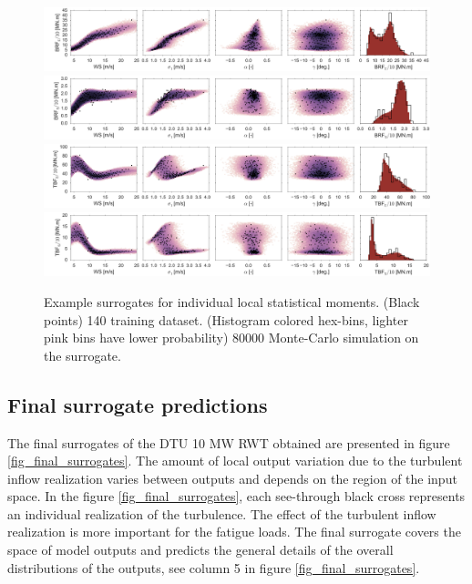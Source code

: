\documentclass[preprint,12pt]{elsarticle}
\begin{document}
\begin{figure}[h!]
\begin{centering}
\includegraphics[width=0.94\columnwidth]{Figures/Surrgotes_20-fold/BRFBM_EFL_M12_E_MC_PCE_last_row.jpg} \\
\includegraphics[width=0.94\columnwidth]{Figures/Surrgotes_20-fold/BRFBM_EFL_M12_S_MC_PCE_last_row.jpg} \\
\includegraphics[width=0.94\columnwidth]{Figures/Surrgotes_20-fold/TBFBM_EFL_M4_E_MC_PCE_last_row.jpg} \\
\includegraphics[width=0.94\columnwidth]{Figures/Surrgotes_20-fold/TBFBM_EFL_M4_S_MC_PCE_last_row.jpg}
\caption{Example surrogates for individual local statistical moments. (Black points) 140 training dataset. (Histogram colored hex-bins, lighter pink bins have lower probability) 80000 Monte-Carlo simulation on the surrogate.}
\label{fig_y_hat_E_V2}
\end{centering}
\end{figure}


\subsection{Final surrogate predictions}

The final surrogates of the DTU 10 MW RWT obtained are presented in figure \ref{fig_final_surrogates}. The amount of local output variation due to the turbulent inflow realization varies between outputs and depends on the region of the input space. In the figure \ref{fig_final_surrogates}, each see-through black cross represents an individual realization of the turbulence. The effect of the turbulent inflow realization is more important for the fatigue loads. The final surrogate covers the space of model outputs and predicts the general details of the overall distributions of the outputs, see column 5 in figure \ref{fig_final_surrogates}.
\end{document}
